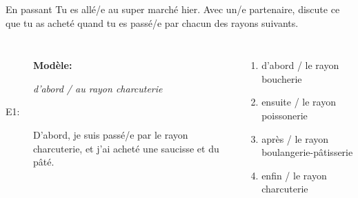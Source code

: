 \begin{frame}{En passant}
  Tu es allé/e au super marché hier.
  Avec un/e partenaire, discute ce que tu as acheté quand tu es passé/e par chacun des rayons suivants. \\
  \begin{columns}
      \begin{description}
        \item[] \textbf{Modèle:}
        \item[] \emph{d'abord / au rayon charcuterie}
        \item[E1:] D'abord, je suis passé/e par le rayon charcuterie, et j'ai acheté une saucisse et du pâté.
        \item[] 
      \end{description}
      \begin{enumerate}
        \item d'abord / le rayon boucherie
        \item ensuite / le rayon poissonerie
        \item après / le rayon boulangerie-pâtisserie
        \item enfin / le rayon charcuterie
      \end{enumerate}
  \end{columns}
\end{frame}